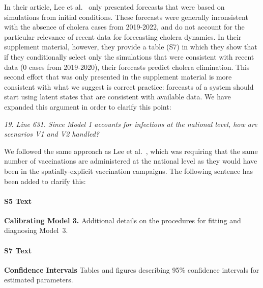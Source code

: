 \documentclass[11pt]{article}
\newcommand\report[1]{{\color{mygreen} \vspace{1mm}\hspace{0.25in}\parbox{6in}{\em #1}}}
\newcommand\article[1]{{\color{blue} \vspace{1mm}\hspace{0.25in}\parbox{6in}{\em #1}}}
\begin{document}
In their article, Lee et al.~\cite{lee20} only presented forecasts that were based on simulations from initial conditions. These forecasts were generally inconsistent with the absence of cholera cases from 2019-2022, and do not account for the particular relevance of recent data for forecasting cholera dynamics. In their supplement material, however, they provide a table (S7) in which they show that if they conditionally select only the simulations that were consistent with recent data (0 cases from 2019-2020), their forecasts predict cholera elimination. This second effort that was only presented in the supplement material is more consistent with what we suggest is correct practice: forecasts of a system should start using latent states that are consistent with available data. We have expanded this argument in order to clarify this point:

\article{\editForecastOne}

\article{\editForecastTwo}

\report{
  19. Line 631. Since Model 1 accounts for infections at the national level, how are scenarios V1 and V2 handled?
}

We followed the same approach as Lee et al.~\cite{lee20}, which was requiring that the same number of vaccinations are administered at the national level as they would have been in the spatially-explicit vaccination campaigns.
The following sentence has been added to clarify this:

\article{\editModVacc}



\paragraph*{S5 Text}
\label{S_mod3cal}
{\bf Calibrating Model 3.} Additional details on the procedures for fitting and diagnosing Model~3.

\paragraph*{S7 Text}
\label{S_CI}
{\bf Confidence Intervals} Tables and figures describing 95\% confidence intervals for estimated parameters.
\end{document}
